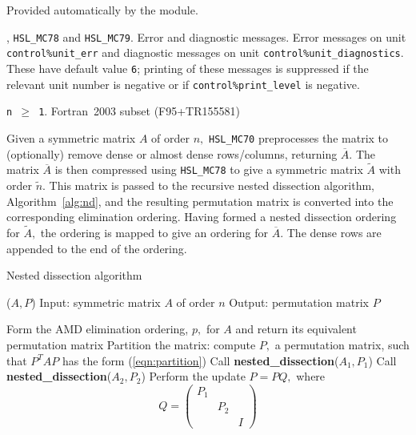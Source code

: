 \documentclass{stfc}
\newcommand{\libraryname}{HSL}
\newcommand{\packagename}{MC70}
\newcommand{\fullpackagename}{\libraryname\_\packagename}
\begin{document}
\hslgeneral

\hslworkspace Provided automatically by the module.

, {\tt HSL\_MC78} and {\tt HSL\_MC79}.
\hslio Error and diagnostic messages.
   Error messages on unit {\tt control\%unit\_err}
   and diagnostic messages on unit {\tt control\%unit\_diagnostics}. These have default value {\tt 6};
   printing of these messages is suppressed if the relevant unit number
   is negative or if {\tt control\%print\_level} is negative.

\hslrestrictions
{\tt n $\ge$ 1}.
\hslportability Fortran~2003 subset (F95+TR155581)

\hslmethod



Given a symmetric matrix $A$ of order $n,$ {\tt \fullpackagename} preprocesses the matrix to (optionally) remove dense or almost dense rows/columns, returning $\overline{A}.$ The matrix $\overline{A}$ is then compressed using {\tt HSL\_MC78} to give a symmetric matrix $\widetilde{A}$ with order $\tilde{n}.$ This matrix is passed to the recursive nested dissection algorithm, Algorithm~\ref{alg:nd}, and the resulting permutation matrix is converted into the corresponding elimination ordering. Having formed a nested dissection ordering for $\widetilde{A},$ the ordering is mapped to give an ordering for $\overline{A}.$ The dense rows are appended to the end of the ordering. 

\begin{algorithm}\caption{Nested dissection algorithm}\label{alg:nd}
\begin{algorithmic}
($A,P$)
\STATE Input: symmetric matrix $A$ of order $n$
\STATE Output: permutation matrix $P$

\STATE Form the AMD elimination ordering, $p,$ for $A$ and return its equivalent permutation matrix 
\ELSE
\STATE Partition the matrix: compute $P,$ a permutation matrix, such that $P^T A P$ has the form (\ref{eqn:partition})
\STATE Call {\bf nested\_dissection}($A_1,P_1$)
\STATE Call {\bf nested\_dissection}($A_2,P_2$)
\STATE Perform the update $P = PQ,$ where $$Q = \left( \begin{array}{ccc} P_1 & & \\ & P_2 & \\ & & I  \end{array} \right)$$
\ENDIF

\end{algorithmic}
\end{algorithm}
\end{document}
